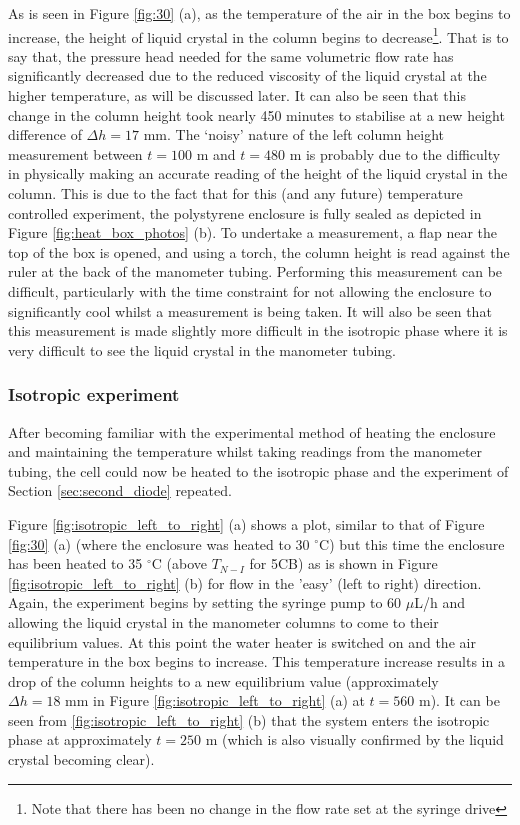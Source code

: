 As is seen in Figure \ref{fig:30} (a), as the temperature of the air in the box begins to increase, the height of liquid crystal in the column begins to decrease\footnote{Note that there has been no change in the flow rate set at the syringe drive}. That is to say that, the pressure head needed for the same volumetric flow rate has significantly decreased due to the reduced viscosity of the liquid crystal at the higher temperature, as will be discussed later. It can also be seen that this change in the column height took nearly 450 minutes to stabilise at a new height difference of  $\Delta h=17\text{ mm}$. The `noisy' nature of the left column height measurement between $t=100\text{ m}$ and $t=480\text{ m}$ is probably due to the difficulty in physically making an accurate reading of the height of the liquid crystal in the column. This is due to the fact that for this (and any future) temperature controlled experiment, the polystyrene enclosure is fully sealed as depicted in Figure \ref{fig:heat_box_photos} (b). To undertake a measurement, a flap near the top of the box is opened, and using a torch, the column height is read against the ruler at the back of the manometer tubing. Performing this measurement can be difficult, particularly with the time constraint for not allowing the enclosure to significantly cool whilst a measurement is being taken. It will also be seen that this measurement is made slightly more difficult in the isotropic phase where it is very difficult to see the liquid crystal in the manometer tubing.

\subsubsection{Isotropic experiment}
\label{sec:iso_experiment}
After becoming familiar with the experimental method of heating the enclosure and maintaining the temperature whilst taking readings from the manometer tubing, the cell could now be heated to the isotropic phase and the experiment of Section \ref{sec:second_diode} repeated.

Figure \ref{fig:isotropic_left_to_right} (a) shows a plot, similar to that of Figure \ref{fig:30} (a) (where the enclosure was heated to 30 $^{\circ}\text{C}$) but this time the enclosure has been heated to 35 $^{\circ}\text{C}$ (above $T_{N-I}$ for 5CB) as is shown in Figure \ref{fig:isotropic_left_to_right} (b) for flow in the 'easy' (left to right) direction. Again, the experiment begins by setting the syringe pump to 60 $\mu$L/h and allowing the liquid crystal in the manometer columns to come to their equilibrium values. At this point the water heater is switched on and the air temperature in the box begins to increase. This temperature increase results in a drop of the column heights to a new equilibrium value (approximately $\Delta h=18\text{ mm}$ in Figure \ref{fig:isotropic_left_to_right} (a) at $t=560\text{ m}$). It can be seen from \ref{fig:isotropic_left_to_right} (b) that the system enters the isotropic phase at approximately $t=250\text{ m}$ (which is also visually confirmed by the liquid crystal becoming clear).

